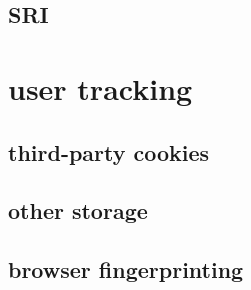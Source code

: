 \subsection{SRI}


\section{user tracking}


\subsection{third-party cookies}



\subsection{other storage}


\subsection{browser fingerprinting}


%
